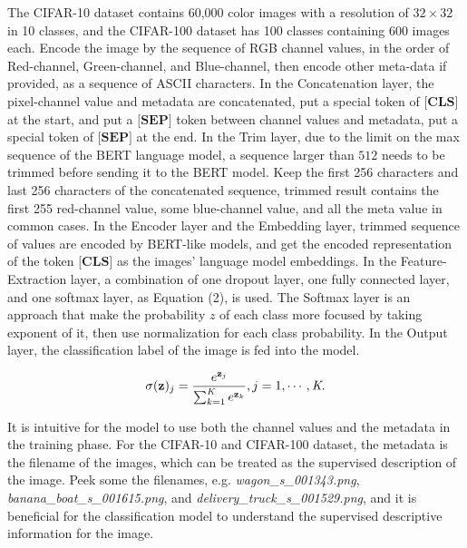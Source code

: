 \documentclass[runningheads]{llncs}
\begin{document}
\par The CIFAR-10 dataset contains 60,000 color images with a resolution of $32\times32$ in 10 classes, and the CIFAR-100 dataset has 100 classes containing 600 images each.
Encode the image by the sequence of RGB channel values, in the order of Red-channel, Green-channel, and Blue-channel,
then encode other meta-data if provided, as a sequence of ASCII characters.
In the Concatenation layer, the pixel-channel value and metadata are concatenated, put a special token of $\textbf{[CLS]}$ at the start,
and put a $\textbf{[SEP]}$ token between channel values and metadata, put a special token of $\textbf{[SEP]}$ at the end.
In the Trim layer, due to the limit on the max sequence of the BERT language model, a sequence larger than $512$ needs to be trimmed before sending it to the BERT model.
Keep the first 256 characters and last 256 characters of the concatenated sequence, trimmed result contains the first 255 red-channel value,
some blue-channel value, and all the meta value in common cases.
In the Encoder layer and the Embedding layer, trimmed sequence of values are encoded by BERT-like models,
and get the encoded representation of the token $\textbf{[CLS]}$ as the images' language model embeddings.
In the Feature-Extraction layer, a combination of one dropout layer, one fully connected layer, and one softmax layer, as Equation (2), is used.
The Softmax layer is an approach that make the probability $z$ of each class more focused by taking exponent of it, then use normalization for each class probability.
In the Output layer, the classification label of the image is fed into the model.

\begin{equation}
  \sigma(\textbf{z})_j = {e^{\textbf{z}_j} \over {\sum_{k=1}^{\textit{K}} e^{\textbf{z}_k}}}, j=1,\cdots,\textit{K}.
\end{equation}

\par It is intuitive for the model to use both the channel values and the metadata in the training phase.
For the CIFAR-10 and CIFAR-100 dataset, the metadata is the filename of the images, which can be treated as the supervised description of the image.
Peek some the filenames, e.g. \textit{wagon\_s\_001343.png}, \textit{banana\_boat\_s\_001615.png}, and \textit{delivery\_truck\_s\_001529.png},
and it is beneficial for the classification model to understand the supervised descriptive information for the image.

\end{document}
